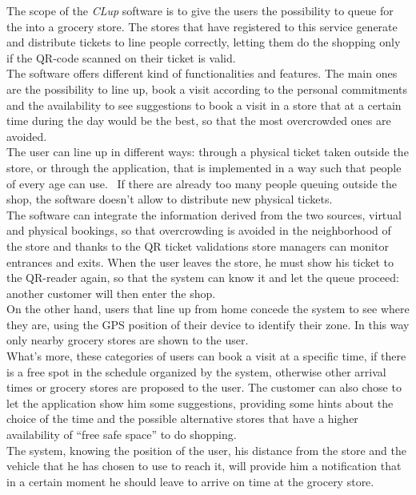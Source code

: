 \documentclass[]{article}
\begin{document}
				The scope of the \textit{CLup} software is to give the users the possibility to queue for the into a grocery store.
The stores that have registered to this service generate and distribute tickets to line people correctly, letting them do the shopping only if the QR-code scanned on their ticket is valid.\\
The software offers different kind of functionalities and features. The main ones are the possibility to line up, book a visit according to the personal commitments and the availability to see suggestions to book a visit in a store that at a certain time during the day would be the best, so that the most overcrowded ones are avoided.\\
			\newline
The user can line up in different ways: through a physical ticket taken outside the store, or through the application, that is implemented in a way such that people of every age can use. 
If there are already too many people queuing outside the shop, the software doesn’t allow to distribute new physical tickets. \\
The software can integrate the information derived from the two sources, virtual and physical bookings, so that overcrowding is avoided in the neighborhood of the store and thanks to the QR ticket validations store managers can monitor entrances and exits. When the user leaves the store, he must show his ticket to the QR-reader again, so that the system can know it and let the queue proceed: another customer will then enter the shop.\\
			\newline
On the other hand, users that line up from home concede the system to see where they are, using the GPS position of their device to identify their zone. In this way only nearby grocery stores are shown to the user.\\
What’s more, these categories of users can book a visit at a specific time, if there is a free spot in the schedule organized by the system, otherwise other arrival times or grocery stores are proposed to the user. The customer can also chose to let the application show him some suggestions, providing some hints about the choice of the time and the possible alternative stores that have a higher availability of “free safe space” to do shopping.\\
The system, knowing the position of the user, his distance from the store and the vehicle that he has chosen to use to reach it, will provide him a notification that in a certain moment he should leave to arrive on time at the grocery store.\\
\end{document}
